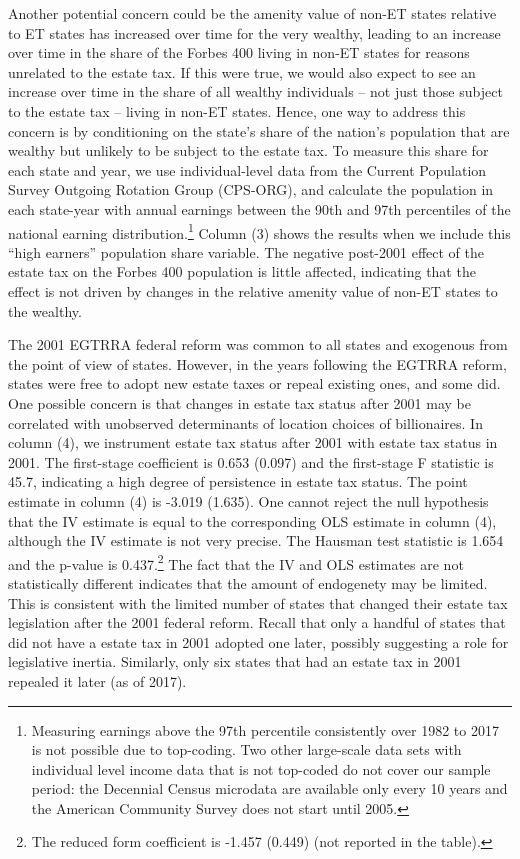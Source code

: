 \documentclass[12pt]{article}
\begin{document}
Another potential concern could be the amenity value of non-ET states relative to ET states has increased over time for the very wealthy, leading to an increase over time in the share of the Forbes 400 living in non-ET states for reasons unrelated to the estate tax. If this were true, we would also expect to see an increase over time in the share of all wealthy individuals -- not just those subject to the estate tax -- living in non-ET states. Hence, one way to address this concern is by conditioning on the state's share of the nation's population that are wealthy but unlikely to be subject to the estate tax. To measure this share for each state and year, we use individual-level data from the Current Population Survey Outgoing Rotation Group (CPS-ORG), and calculate the population in each state-year with annual earnings between the 90th and 97th percentiles of the national earning distribution.\footnote{Measuring earnings above the 97th percentile consistently over 1982 to 2017 is not possible due to top-coding. Two other large-scale data sets with individual level income data that is not top-coded do not cover our sample period: the Decennial Census microdata are available only every 10 years and the American Community Survey does not start until 2005.} Column (3) shows the results when we include this ``high earners'' population share variable. The negative post-2001 effect of the estate tax on the Forbes 400 population is little affected, indicating that the effect is not driven by changes in the relative amenity value of non-ET states to the wealthy.

The 2001 EGTRRA federal reform was common to all states and exogenous from the point of view of states. However, in the years following the EGTRRA reform, states were free to adopt new estate taxes or repeal existing ones, and some did. One possible concern is that changes in estate tax status after 2001 may be correlated with unobserved determinants of location choices of billionaires.
In column (4), we instrument estate tax status after 2001 with estate tax status in 2001. The first-stage coefficient is 0.653 (0.097) and the first-stage F statistic is 45.7, indicating a high degree of persistence in estate tax status. The point estimate in column (4) is -3.019 (1.635). One cannot reject the null hypothesis that the IV estimate is equal to the corresponding OLS estimate in column (4), although the IV estimate is not very precise. 
The Hausman test statistic is 1.654 and the p-value is 0.437.\footnote{The reduced form coefficient is -1.457 (0.449) (not reported in the table).}  
The fact that the IV and OLS estimates are not statistically different indicates that the amount of endogenety may be limited. This is consistent with the limited number of states that changed their estate tax legislation after the 2001 federal reform. Recall that only a handful of states that did not have a estate tax in 2001 adopted one later, possibly suggesting a role for legislative inertia. Similarly, only six states that had an estate tax in 2001 repealed it later (as of 2017).
\end{document}
